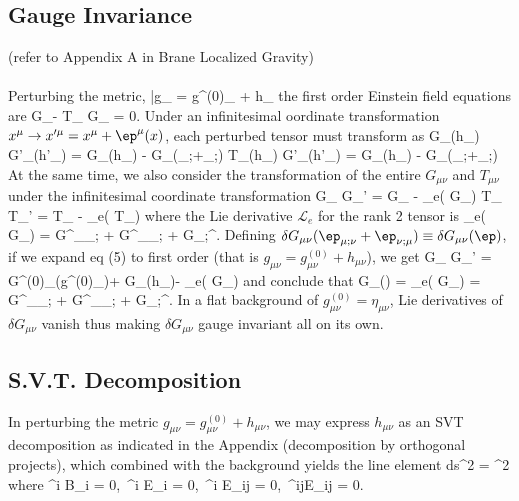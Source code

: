 \documentclass[10pt,letterpaper]{article}
\begin{document}
\subsection{Gauge Invariance}
(refer to Appendix A in Brane Localized Gravity)
\\ \\
Perturbing the metric, 
\be
	\bar g_{\mu\nu} =  g^{(0)}_{\mu\nu} + h_{\mu\nu} 
\ee
the first order Einstein field equations are
\be
	\delta G_{\mu\nu}- \delta T_{\mu\nu} \equiv \Delta G_{\mu\nu} = 0.
\ee
Under an infinitesimal oordinate transformation $x^\mu \to x'^\mu = x^\mu + \ep^\mu(x)$, each perturbed tensor must transform as
\be
	\delta G_{\mu\nu}(h_{\mu\nu}) \to \delta G'_{\mu\nu}(h'_{\mu\nu}) = \delta G_{\mu\nu}(h_{\mu\nu}) - \delta G_{\mu\nu}(\ep_{\mu;\nu}+\ep_{\nu;\mu})
\ee
\be
	\delta T_{\mu\nu}(h_{\mu\nu}) \to \delta G'_{\mu\nu}(h'_{\mu\nu}) = \delta G_{\mu\nu}(h_{\mu\nu}) - \delta G_{\mu\nu}(\ep_{\mu;\nu}+\ep_{\nu;\mu})
\ee
At the same time, we also consider the transformation of the entire $G_{\mu\nu}$ and $T_{\mu\nu}$ under the infinitesimal coordinate transformation
\be
	G_{\mu\nu} \to G_{\mu\nu}' = G_{\mu\nu} - _e( G_{\mu\nu})
\ee
\be
	T_{\mu\nu} \to T_{\mu\nu}' = T_{\mu\nu} - _e( T_{\mu\nu})
\ee
where the Lie derivative $\mathcal L_e$ for the rank 2 tensor is
\be
	 _e( G_{\mu\nu}) = G^{\lambda}{}_\mu \ep_{\lambda;\nu} + G^{\lambda}{}_\nu \ep_{\lambda;\mu} + G_{\mu\nu;\lambda}\ep^\lambda.
\ee
Defining $\delta G_{\mu\nu}(\ep_{\mu;\nu}+\ep_{\nu;\mu}) \equiv \delta G_{\mu\nu}(\ep)$, if we expand eq (5) to first order (that is $g_{\mu\nu} = g^{(0)}_{\mu\nu} + h_{\mu\nu}$), we get
\be
	G_{\mu\nu} \to G_{\mu\nu}' = G^{(0)}_{\mu\nu}(g^{(0)}_{\mu\nu})+ \delta G_{\mu\nu}(h_{\mu\nu})- _e( G_{\mu\nu})
\ee
and conclude that
\be
	 \delta G_{\mu\nu}(\ep) =  _e( G_{\mu\nu}) = G^{\lambda}{}_\mu \ep_{\lambda;\nu} + G^{\lambda}_\nu \ep_{\lambda;\mu} + G_{\mu\nu;\lambda}\ep^\lambda.
\ee
In a flat background of $g_{\mu\nu}^{(0)} = \eta_{\mu\nu}$, Lie derivatives of $\delta G_{\mu\nu}$ vanish thus making $\delta G_{\mu\nu}$ gauge invariant all on its own.
\subsection{S.V.T. Decomposition}
In perturbing the metric $g_{\mu\nu} = g^{(0)}_{\mu\nu} + h_{\mu\nu}$, we may express $h_{\mu\nu}$ as an SVT decomposition as indicated in the Appendix (decomposition by orthogonal projects), which combined with the background yields the line element
\be
	ds^2 = \Omega^2 
\ee
where
\be
	\del^i B_i = 0,\ \del^i E_i = 0,\ \del^i E_{ij} = 0,\ \delta^{ij}E_{ij} = 0.
\ee
\end{document}
